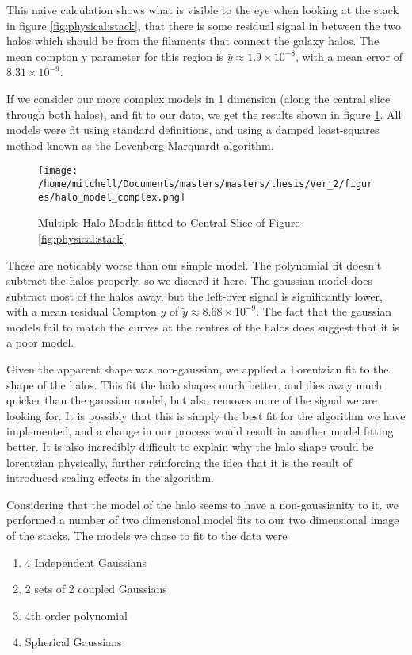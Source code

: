 This naive calculation shows what is visible to the eye when looking at the stack in figure \ref{fig:physical:stack}, that there is some residual signal in between the two halos which should be from the filaments that connect the galaxy halos. The mean compton y parameter for this region is $\bar{y} \approx 1.9 \times 10^{-8}$, with a mean error of $8.31 \times 10^{-9}$. 



\par If we consider our more complex models in 1 dimension (along the central slice through both halos), and fit to our data, we get the results shown in figure \ref{fig:halo:complex_model}. All models were fit using standard definitions, and using a damped least-squares method known as the Levenberg-Marquardt algorithm.

\begin{figure}[h!]
\centering
\texttt{[image: /home/mitchell/Documents/masters/masters/thesis/Ver\_2/figures/halo\_model\_complex.png]}
\caption{ Multiple Halo Models fitted to Central Slice of Figure \ref{fig:physical:stack} }
\label{fig:halo:complex_model}
\end{figure}

These are noticably worse than our simple model. The polynomial fit doesn't subtract the halos properly, so we discard it here. The gaussian model does subtract most of the halos away, but the left-over signal is significantly lower, with a mean residual Compton $y$ of $\tilde{y} \approx 8.68 \times 10^{-9}$. The fact that the gaussian models fail to match the curves at the centres of the halos does suggest that it is a poor model.

\par Given the apparent shape was non-gaussian, we applied a Lorentzian fit to the shape of the halos. This fit the halo shapes much better, and dies away much quicker than the gaussian model, but also removes more of the signal we are looking for. It is possibly that this is simply the best fit for the algorithm we have implemented, and a change in our process would result in another model fitting better. It is also incredibly difficult to explain why the halo shape would be lorentzian physically, further reinforcing the idea that it is the result of introduced scaling effects in the algorithm. 

\par Considering that the model of the halo seems to have a non-gaussianity to it, we performed a number of two dimensional model fits to our two dimensional image of the stacks. The models we chose to fit to the data were 
\begin{enumerate}[label=(\Roman*)]
\item 4 Independent Gaussians \label{2D:model:1}
\item 2 sets of 2 coupled Gaussians \label{2D:model:2}
\item 4th order polynomial \label{2D:model:3}
\item Spherical Gaussians \label{2D:model:4}
\end{enumerate}


